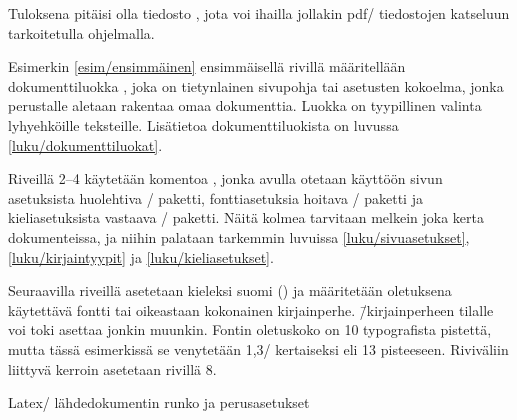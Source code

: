 \noindent
Tuloksena pitäisi olla tiedosto , jota voi ihailla
jollakin pdf\-/ tiedostojen katseluun tarkoitetulla ohjelmalla.

Esimerkin \ref{esim/ensimmäinen} ensimmäisellä rivillä määritellään
dokumenttiluokka , joka on tietynlainen sivupohja tai
asetusten kokoelma, jonka perustalle aletaan rakentaa omaa dokumenttia.
Luokka  on tyypillinen valinta lyhyehköille teksteille.
Lisätietoa dokumenttiluokista on luvussa \ref{luku/dokumenttiluokat}.

Riveillä 2--4 käytetään komentoa , jonka avulla
otetaan käyttöön sivun asetuksista huolehtiva \-/
paketti, fonttiasetuksia hoitava \-/ paketti ja
kieliasetuksista vastaava \-/ paketti. Näitä kolmea
tarvitaan melkein joka kerta dokumenteissa, ja niihin palataan tarkemmin
luvuissa \ref{luku/sivuasetukset}, \ref{luku/kirjaintyypit} ja
\ref{luku/kieliasetukset}.

Seuraavilla riveillä asetetaan kieleksi suomi () ja
määritetään oletuksena käytettävä fontti tai oikeastaan kokonainen
kirjainperhe.  \=/kirjainperheen tilalle
voi toki asettaa jonkin muunkin. Fontin oletuskoko on 10 typografista
pistettä, mutta tässä esimerkissä se venytetään 1,3\-/ kertaiseksi eli
13 pisteeseen. Riviväliin liittyvä kerroin asetetaan rivillä 8.

\begin{esimerkki*}

  \caption{Latex\-/ lähdedokumentin runko ja perusasetukset}
  \label{esim/ensimmäinen}
\end{esimerkki*}

